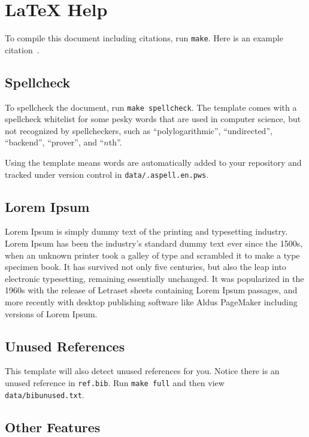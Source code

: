 \section{\LaTeX{} Help}

To compile this document including citations, run \texttt{make}.
Here is an example citation~\cite{knuth1997art}.

\subsection{Spellcheck}

To spellcheck the document, run \texttt{make spellcheck}.
The template comes with a spellcheck whitelist for some pesky words that
are used in computer science, but not recognized by spellcheckers, such as
``polylogarithmic'', ``undirected'', ``backend'', ``prover'', and ``$n$th''.

Using the template means words are automatically added to your repository and
tracked under version control in \texttt{data/.aspell.en.pws}.

\subsection{Lorem Ipsum}

Lorem Ipsum is simply dummy text of the printing and typesetting industry. Lorem Ipsum has been the industry's standard dummy text ever since the 1500s, when an unknown printer took a galley of type and scrambled it to make a type specimen book. It has survived not only five centuries, but also the leap into electronic typesetting, remaining essentially unchanged. It was popularized in the 1960s with the release of Letraset sheets containing Lorem Ipsum passages, and more recently with desktop publishing software like Aldus PageMaker including versions of Lorem Ipsum.

\subsection{Unused References}

This template will also detect unused references for you.
Notice there is an unused reference in \texttt{ref.bib}.
Run \texttt{make full} and then view \texttt{data/bibunused.txt}.

\subsection{Other Features}

